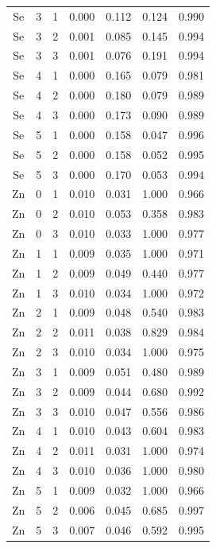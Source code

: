 \documentclass[ms, hidelinks]{uncgdissertationexp}
\theoremstyle{plain}
\theoremstyle{definition}
\theoremstyle{remark}
\begin{document}
\begin{longtable}{ccccccc}
Se & 3 & 1 & 0.000 & 0.112 & 0.124 & 0.990\\
\rowcolor{gray!6}  Se & 3 & 2 & 0.001 & 0.085 & 0.145 & 0.994\\
Se & 3 & 3 & 0.001 & 0.076 & 0.191 & 0.994\\
\rowcolor{gray!6}  Se & 4 & 1 & 0.000 & 0.165 & 0.079 & 0.981\\
Se & 4 & 2 & 0.000 & 0.180 & 0.079 & 0.989\\
\rowcolor{gray!6}  Se & 4 & 3 & 0.000 & 0.173 & 0.090 & 0.989\\
Se & 5 & 1 & 0.000 & 0.158 & 0.047 & 0.996\\
\rowcolor{gray!6}  Se & 5 & 2 & 0.000 & 0.158 & 0.052 & 0.995\\
Se & 5 & 3 & 0.000 & 0.170 & 0.053 & 0.994\\
\rowcolor{gray!6}  Zn & 0 & 1 & 0.010 & 0.031 & 1.000 & 0.966\\
Zn & 0 & 2 & 0.010 & 0.053 & 0.358 & 0.983\\
\rowcolor{gray!6}  Zn & 0 & 3 & 0.010 & 0.033 & 1.000 & 0.977\\
Zn & 1 & 1 & 0.009 & 0.035 & 1.000 & 0.971\\
\rowcolor{gray!6}  Zn & 1 & 2 & 0.009 & 0.049 & 0.440 & 0.977\\
Zn & 1 & 3 & 0.010 & 0.034 & 1.000 & 0.972\\
\rowcolor{gray!6}  Zn & 2 & 1 & 0.009 & 0.048 & 0.540 & 0.983\\
Zn & 2 & 2 & 0.011 & 0.038 & 0.829 & 0.984\\
\rowcolor{gray!6}  Zn & 2 & 3 & 0.010 & 0.034 & 1.000 & 0.975\\
Zn & 3 & 1 & 0.009 & 0.051 & 0.480 & 0.989\\
\rowcolor{gray!6}  Zn & 3 & 2 & 0.009 & 0.044 & 0.680 & 0.992\\
Zn & 3 & 3 & 0.010 & 0.047 & 0.556 & 0.986\\
\rowcolor{gray!6}  Zn & 4 & 1 & 0.010 & 0.043 & 0.604 & 0.983\\
Zn & 4 & 2 & 0.011 & 0.031 & 1.000 & 0.974\\
\rowcolor{gray!6}  Zn & 4 & 3 & 0.010 & 0.036 & 1.000 & 0.980\\
Zn & 5 & 1 & 0.009 & 0.032 & 1.000 & 0.966\\
\rowcolor{gray!6}  Zn & 5 & 2 & 0.006 & 0.045 & 0.685 & 0.997\\
Zn & 5 & 3 & 0.007 & 0.046 & 0.592 & 0.995\\*
\end{longtable}
\clearpage
\end{document}
